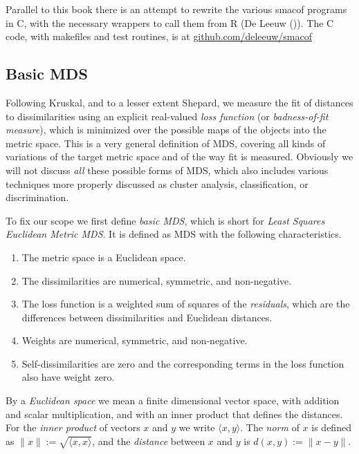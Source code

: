\documentclass[
  12pt,
  letterpaper,
  DIV=11,
  numbers=noendperiod]{scrartcl}
\providecommand{\tightlist}{%
  \setlength{\itemsep}{0pt}\setlength{\parskip}{0pt}}\usepackage{longtable,booktabs,array}
\begin{document}
Parallel to this book there is an attempt to rewrite the various smacof
programs in C, with the necessary wrappers to call them from R (De Leeuw
()). The C code, with makefiles and
test routines, is at
\href{https://github.com/deleeuw/smacof}{github.com/deleeuw/smacof}

\subsection{Basic MDS}\label{introbasic}

Following Kruskal, and to a lesser extent Shepard, we measure the fit of
distances to dissimilarities using an explicit real-valued \emph{loss
function} (or \emph{badness-of-fit measure}), which is minimized over
the possible maps of the objects into the metric space. This is a very
general definition of MDS, covering all kinds of variations of the
target metric space and of the way fit is measured. Obviously we will
not discuss \emph{all} these possible forms of MDS, which also includes
various techniques more properly discussed as cluster analysis,
classification, or discrimination.

To fix our scope we first define \emph{basic MDS}, which is short for
\emph{Least Squares Euclidean Metric MDS}. It is defined as MDS with the
following characteristics.

\begin{enumerate}
\def\labelenumi{\arabic{enumi}.}
\tightlist
\item
  The metric space is a Euclidean space.
\item
  The dissimilarities are numerical, symmetric, and non-negative.
\item
  The loss function is a weighted sum of squares of the
  \emph{residuals}, which are the differences between dissimilarities
  and Euclidean distances.
\item
  Weights are numerical, symmetric, and non-negative.
\item
  Self-dissimilarities are zero and the corresponding terms in the loss
  function also have weight zero.
\end{enumerate}

By a \emph{Euclidean space} we mean a finite dimensional vector space,
with addition and scalar multiplication, and with an inner product that
defines the distances. For the \emph{inner product} of vectors \(x\) and
\(y\) we write \(\langle x,y\rangle\). The \emph{norm} of \(x\) is
defined as \(\|x\|:=\sqrt{\langle x,x\rangle}\), and the \emph{distance}
between \(x\) and \(y\) is \(d(x,y):=\|x-y\|\).
\end{document}
